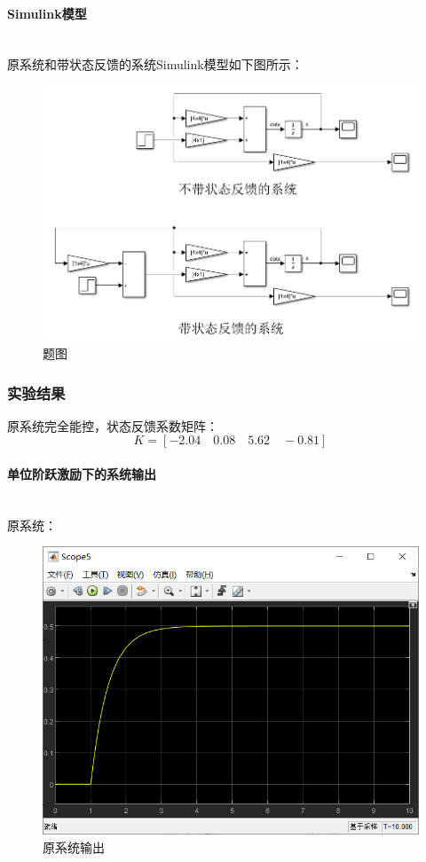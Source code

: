 \documentclass[UTF8]{article}
\begin{document}
\paragraph{Simulink模型}~{}
\\
原系统和带状态反馈的系统Simulink模型如下图所示：
\begin{figure}[H]
    \centering %
    \includegraphics[width=.8\textwidth]{figure/exp3_1_model.png} 
    \caption{题图} %
\end{figure}


\subsubsection{实验结果}
原系统完全能控，状态反馈系数矩阵：
$$
K = [-2.04 \quad 0.08 \quad 5.62 \quad -0.81]
$$

\paragraph{单位阶跃激励下的系统输出}~{}
\\
原系统：
\begin{figure}[H]
    \centering %
    \includegraphics[width=.8\textwidth]{figure/exp3_1_原系统输出.png} 
    \caption{原系统输出} %
\end{figure}
\end{document}
